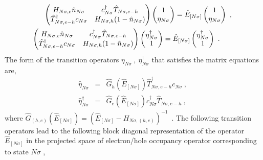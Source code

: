 \documentclass[12pt,a4paper]{article}
\begin{document}
\begin{eqnarray}
\begin{pmatrix}
H_{N\sigma,e}\hat{n}_{N\sigma} & c^{\dagger}_{N\sigma}\hat{T}_{N\sigma,e-h} \\
\hat{T}^{\dagger}_{N\sigma,e-h}c_{N\sigma} & H_{N\sigma,h}(1-\hat{n}_{N\sigma})
\end{pmatrix}\begin{pmatrix}
1 \\ \eta_{N\sigma}
\end{pmatrix} = \hat{E}_{[N\sigma]} \begin{pmatrix}
1 \\ \eta_{N\sigma}
\end{pmatrix}~,~\nonumber\\\begin{pmatrix}
H_{N\sigma,e}\hat{n}_{N\sigma} & c^{\dagger}_{N\sigma}\hat{T}_{N\sigma,e-h} \\
\hat{T}^{\dagger}_{N\sigma,e-h}c_{N\sigma} & H_{N\sigma,h}(1-\hat{n}_{N\sigma})
\end{pmatrix}\begin{pmatrix}
\eta^{\dagger}_{N\sigma} \\ 1 
\end{pmatrix} =\hat{E}_{[N\sigma]} \begin{pmatrix}
\eta^{\dagger}_{N\sigma} \\ 1 
\end{pmatrix}~.\hspace*{0.7cm}\label{matrix_eqn1}
\end{eqnarray}
The form of the transition operators $\eta_{N\sigma}~,~ \eta^{\dagger}_{N\sigma}$ that satisfies the matrix equations are, 
\begin{eqnarray}
\hat{\eta}_{N\sigma} &=& \hat{G}_{h}(\hat{E}_{[N\sigma]})\hat{T}^{\dagger}_{N\sigma,e-h}c_{N\sigma}~,~\nonumber\\
\hat{\eta}^{\dagger}_{N\sigma} &=& \hat{G}_{e}(\hat{E}_{[N\sigma]})c^{\dagger}_{N\sigma}\hat{T}_{N\sigma,e-h}~,~\label{transition operators}
\end{eqnarray}
where $\hat{G}_{(h,e)}(\hat{E}_{[N\sigma]})=(\hat{E}_{[N\sigma]}-H_{N\sigma,(h,e)})^{-1}$~.
The following transition operators lead to the following block diagonal representation of the operator $\hat{E}_{[N\sigma]}$ in the projected space of electron/hole occupancy operator corresponding to state $N\sigma$ ,
\end{document}
